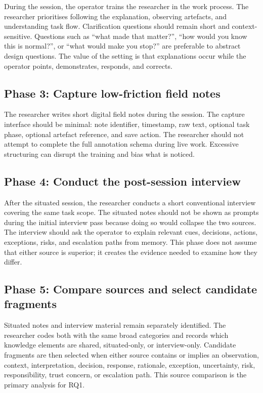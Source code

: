 During the session, the operator trains the researcher in the work process. The researcher prioritises following the explanation, observing artefacts, and understanding task flow. Clarification questions should remain short and context-sensitive. Questions such as ``what made that matter?'', ``how would you know this is normal?'', or ``what would make you stop?'' are preferable to abstract design questions. The value of the setting is that explanations occur while the operator points, demonstrates, responds, and corrects.

\subsection{Phase 3: Capture low-friction field notes}

The researcher writes short digital field notes during the session. The capture interface should be minimal: note identifier, timestamp, raw text, optional task phase, optional artefact reference, and save action. The researcher should not attempt to complete the full annotation schema during live work. Excessive structuring can disrupt the training and bias what is noticed.

\subsection{Phase 4: Conduct the post-session interview}

After the situated session, the researcher conducts a short conventional interview covering the same task scope. The situated notes should not be shown as prompts during the initial interview pass because doing so would collapse the two sources. The interview should ask the operator to explain relevant cues, decisions, actions, exceptions, risks, and escalation paths from memory. This phase does not assume that either source is superior; it creates the evidence needed to examine how they differ.

\subsection{Phase 5: Compare sources and select candidate fragments}

Situated notes and interview material remain separately identified. The researcher codes both with the same broad categories and records which knowledge elements are shared, situated-only, or interview-only. Candidate fragments are then selected when either source contains or implies an observation, context, interpretation, decision, response, rationale, exception, uncertainty, risk, responsibility, trust concern, or escalation path. This source comparison is the primary analysis for RQ1.

